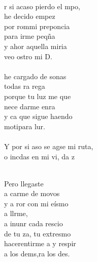\begin{cancion}
	\jump\\
	r si acaso pierdo el mpo, \\
	he decido empez\\
	por rommi preponcia \\
	para irme peqña\\
	y ahor aquella miria\\
	veo ostro mi D. \\
\jump\\
	 he cargado de sonas \\
	todas ra rega\\
	porque tu luz me que \\
	nece darme enra \\
	y ca que sigue haendo \\
	motipara lur. \\
\jump\\
	Y por si aso se agse mi ruta,\\
	o incdas en mi vi, da z\\\jump\\
	\begin{chorus}%
	Pero llegaste   \\
	a carme de movos\\
	y a ror con mi eísmo\\
	a llrme, \\
	a inunr cada rescio\\
	de tu za, tu extresmo \\
	hacerentirme a y respir \\
	a los dems,ra los des. \\
	\end{chorus}%
	\jump\\
\end{cancion}%
